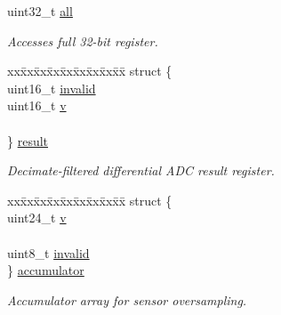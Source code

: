 \begin{DoxyCompactItemize}
\item 
uint32\+\_\+t \hyperlink{unionm_touch___acquisition_data_a7a41c6ef718cad373b525faf8cb8fa7b}{all}
\begin{DoxyCompactList}\small\item\em Accesses full 32-\/bit register. \end{DoxyCompactList}\item 
\begin{tabbing}
xx\=xx\=xx\=xx\=xx\=xx\=xx\=xx\=xx\=\kill
struct \{\\
\>uint16\_t \hyperlink{unionm_touch___acquisition_data_a38249ee73b8e39f22e0fb89f58e3199a}{invalid}\\
\>uint16\_t \hyperlink{unionm_touch___acquisition_data_ac5f38113a34f9eab3e7782eade81d266}{v}\\
\>\\
\} \hyperlink{unionm_touch___acquisition_data_aa9f33fb9109737957f344599a3935aa6}{result}\\

\end{tabbing}\begin{DoxyCompactList}\small\item\em Decimate-\/filtered differential A\+D\+C result register. \end{DoxyCompactList}\item 
\begin{tabbing}
xx\=xx\=xx\=xx\=xx\=xx\=xx\=xx\=xx\=\kill
struct \{\\
\>uint24\_t \hyperlink{unionm_touch___acquisition_data_a2ac4eeaa6f2e6b470ddb2deec565fa7c}{v}\\
\>\\
\>uint8\_t \hyperlink{unionm_touch___acquisition_data_a478aacccaad155596a89d6d5873b4b5e}{invalid}\\
\} \hyperlink{unionm_touch___acquisition_data_a7b21f05f3c5dab574b956e7a6429f403}{accumulator}\\

\end{tabbing}\begin{DoxyCompactList}\small\item\em Accumulator array for sensor oversampling. \end{DoxyCompactList}\end{DoxyCompactItemize}



